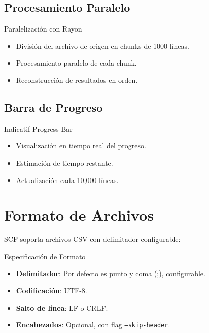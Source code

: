 
\bigskip

\subsection{Procesamiento Paralelo}

\begin{caja}{Paralelización con Rayon}
\begin{itemize}
\item División del archivo de origen en chunks de 1000 líneas.
\item Procesamiento paralelo de cada chunk.
\item Reconstrucción de resultados en orden.
\end{itemize}
\end{caja}


\bigskip

\subsection{Barra de Progreso}

\begin{caja}{Indicatif Progress Bar}
\begin{itemize}
\item Visualización en tiempo real del progreso.
\item Estimación de tiempo restante.
\item Actualización cada 10,000 líneas.
\end{itemize}
\end{caja}


\section{Formato de Archivos}

SCF soporta archivos CSV con delimitador configurable:

\begin{caja}{Especificación de Formato}
\begin{itemize}
\item \textbf{Delimitador}: Por defecto es punto y coma (;), configurable.
\item \textbf{Codificación}: UTF-8.
\item \textbf{Salto de línea}: LF o CRLF.
\item \textbf{Encabezados}: Opcional, con flag \texttt{--skip-header}.
\end{itemize}
\end{caja}

